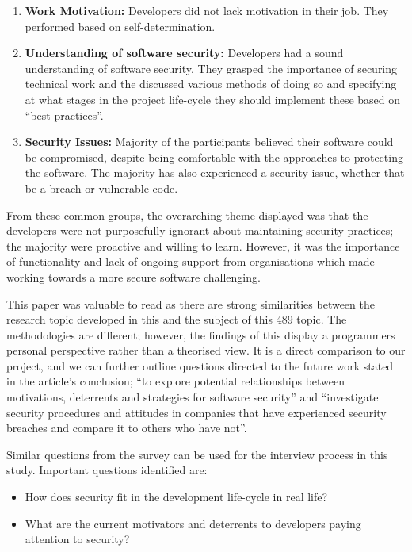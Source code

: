 \begin{enumerate}
\item \textbf{Work Motivation:} Developers did not lack motivation in their job. They performed based on self-determination.
\item \textbf{Understanding of software security:} Developers had a sound understanding of software security. They grasped the importance of securing technical work and the discussed various methods of doing so and specifying at what stages in the project life-cycle they should implement these based on “best practices”.
\item \textbf{Security Issues:} Majority of the participants believed their software could be compromised, despite being comfortable with the approaches to protecting the software. The majority has also experienced a security issue, whether that be a breach or vulnerable code.
\end{enumerate}

\par From these common groups, the overarching theme displayed was that the developers were not purposefully ignorant about maintaining security practices; the majority were proactive and willing to learn. However, it was the importance of functionality and lack of ongoing support from organisations which made working towards a more secure software challenging. 
\newline
\par This paper was valuable to read as there are strong similarities between the research topic developed in this and the subject of this 489 topic. The methodologies are different; however, the findings of this display a programmers personal perspective rather than a theorised view. It is a direct comparison to our project, and we can further outline questions directed to the future work stated in the article’s conclusion; “to explore potential relationships between motivations, deterrents and strategies for software security” and “investigate security procedures and attitudes in companies that have experienced security breaches and compare it to others who have not”. 
\newline
\par Similar questions from the survey can be used for the interview process in this study. Important questions identified are:

\begin{itemize}
\item How does security fit in the development life-cycle in real life? 
\item What are the current motivators and deterrents to developers paying attention to security? 
\end{itemize}

